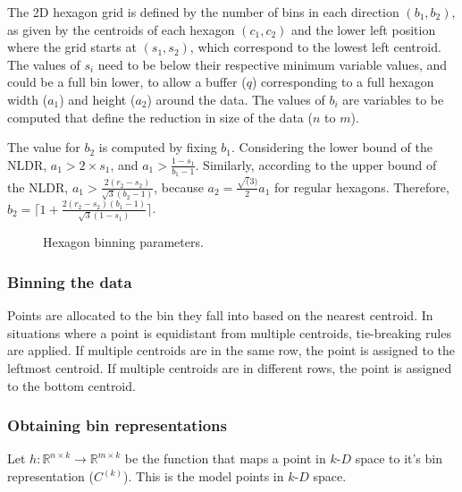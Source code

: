 \documentclass[
  12pt]{article}
\newcommand\kD{$k\text{-}D$}
\begin{document}
The 2D hexagon grid is defined by the number of bins in each direction
\((b_1, b_2)\), as given by the centroids of each hexagon \((c_1, c_2)\)
and the lower left position where the grid starts at \((s_1, s_2)\),
which correspond to the lowest left centroid. The values of \(s_i\) need
to be below their respective minimum variable values, and could be a
full bin lower, to allow a buffer (\(q\)) corresponding to a full
hexagon width (\(a_1\)) and height (\(a_2\)) around the data. The values
of \(b_i\) are variables to be computed that define the reduction in
size of the data (\(n\) to \(m\)).

The value for \(b_2\) is computed by fixing \(b_1\). Considering the
lower bound of the NLDR, \(a_1 > 2 \times s_1\), and
\(a_1 > \frac{1-s_1}{b_1 -1}\). Similarly, according to the upper bound
of the NLDR, \(a_1 > \frac{2(r_2 - s_2)}{\sqrt{3}(b_2 - 1)}\), because
\(a_2 = \frac{\sqrt(3)}{2}a_1\) for regular hexagons. Therefore,
\(b_2 = \Big\lceil1 +\frac{2(r_2 - s_2)(b_1 - 1)}{\sqrt{3}(1-s_1)}\Big\rceil\).

\begin{figure}[H]


\caption{\label{fig-hex-param}Hexagon binning parameters.}

\end{figure}%

\subsubsection{Binning the data}\label{binning-the-data}

Points are allocated to the bin they fall into based on the nearest
centroid. In situations where a point is equidistant from multiple
centroids, tie-breaking rules are applied. If multiple centroids are in
the same row, the point is assigned to the leftmost centroid. If
multiple centroids are in different rows, the point is assigned to the
bottom centroid.

\subsubsection{Obtaining bin
representations}\label{obtaining-bin-representations}

Let \(h : \mathbb{R}^{n\times k} \rightarrow \mathbb{R}^{m\times k}\) be
the function that maps a point in \kD{} space to it's bin representation
(\(C^{(k)}\)). This is the model points in \kD{} space.
\end{document}
